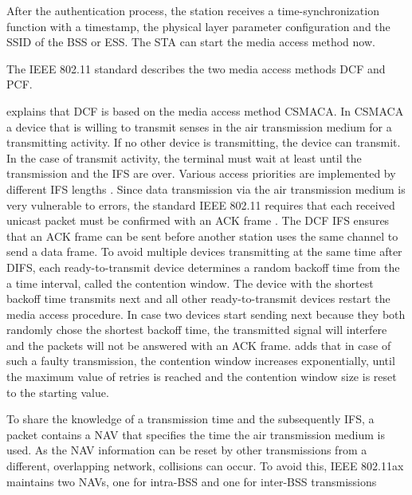 After the authentication process, the station receives a time-synchronization function with a timestamp, the physical layer
parameter configuration and the \ac{SSID} of the \ac{BSS} or \ac{ESS}.
The \ac{STA} can start the media access method now.

The IEEE 802.11 standard describes the two media access methods \ac{DCF} and \ac{PCF}.

\textcite{sauter_wireless_2022} explains that \ac{DCF} is based on the media access method \ac{CSMACA}.
In \ac{CSMACA} a device that is willing to transmit senses in the air transmission medium for a transmitting activity.
If no other device is transmitting, the device can transmit.
In the case of transmit activity, the terminal must wait at least until the transmission and the \ac{IFS} are over.
Various access priorities are implemented by different \ac{IFS} lengths \cite{sommer_vehicular_2014}.
Since data transmission via the air transmission medium is very vulnerable to errors,
the standard IEEE 802.11 requires that each received unicast packet must be confirmed with an \ac{ACK} frame \cite{sommer_vehicular_2014}.
The \ac{DCF} \ac{IFS} ensures that an \ac{ACK} frame can be sent before another station uses the same channel to send a data frame.
To avoid multiple devices transmitting at the same time after \ac{DIFS}, each ready-to-transmit device determines
a random backoff time from the a time interval, called the contention window.
The device with the shortest backoff time transmits next and all other ready-to-transmit devices restart the media access procedure.
In case two devices start sending next because they both randomly chose the shortest backoff time,
the transmitted signal will interfere and the packets will not be answered with an \ac{ACK} frame.
\textcite{sommer_vehicular_2014} adds that in case of such a faulty transmission, the contention window increases exponentially, until the maximum value of retries is reached and
the contention window size is reset to the starting value.

To share the knowledge of a transmission time and the subsequently \ac{IFS}, a packet contains a \ac{NAV} that
specifies the time the air transmission medium is used.
As the \ac{NAV} information can be reset by other transmissions from a different, overlapping network, collisions can occur.
To avoid this, IEEE 802.11ax maintains two \ac{NAV}s, one for intra-\ac{BSS} and one for inter-\ac{BSS} transmissions \cite{noauthor_ieee_2021}

